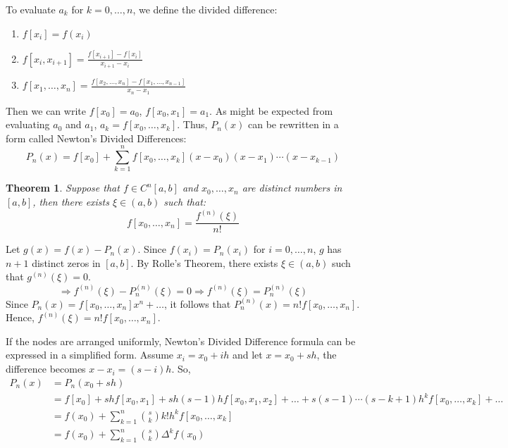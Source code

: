 \documentclass[12pt, a4paper]{article}
\makeatletter
\theoremstyle{break}
\newtheorem{theorem}{Theorem}[section]
\renewenvironment{proof}[1][\proofname]{\par
  \pushQED{\qed}%
  \normalfont \topsep6\p@\@plus6\p@\relax
  \trivlist
  \item[\hskip\labelsep\bfseries #1\@addpunct{.}]\mbox{}\newline\ignorespaces
}{%
  \popQED\endtrivlist\@endpefalse
}
\makeatother
\begin{document}
To evaluate $a_k$ for $k = 0, \dots, n$, we define the divided difference:
\begin{enumerate}
    \item $f[x_i] = f(x_i)$
    \item $f[x_i, x_{i+1}] = \frac{f[x_{i+1}] - f[x_i]}{x_{i+1} - x_i}$
    \item $f[x_1, \dots, x_n] = \frac{f[x_2, \dots, x_n] - f[x_1, \dots, x_{n-1}]}{x_n - x_1}$
\end{enumerate}
Then we can write $f[x_0] = a_0$, $f[x_0, x_1] = a_1$. As might be expected from evaluating $a_0$ and $a_1$, $a_k = f[x_0, \dots, x_k]$. Thus, $P_n(x)$ can be rewritten in a form called Newton's Divided Differences:
\[ P_n(x) = f[x_0] + \sum_{k=1}^{n} f[x_0, \dots, x_k] (x-x_0)(x-x_1)\cdots(x-x_{k-1}) \]

\begin{theorem}
Suppose that $f \in C^n[a,b]$ and $x_0, \dots, x_n$ are distinct numbers in $[a,b]$, then there exists $\xi \in (a,b)$ such that:
\[ f[x_0, \dots, x_n] = \frac{f^{(n)}(\xi)}{n!} \]
\end{theorem}
\begin{proof}
Let $g(x) = f(x) - P_n(x)$. Since $f(x_i) = P_n(x_i)$ for $i = 0, \dots, n$, $g$ has $n+1$ distinct zeros in $[a,b]$. 
By Rolle's Theorem, there exists $\xi \in (a,b)$ such that $g^{(n)}(\xi) = 0$.
\[ \Rightarrow f^{(n)}(\xi) - P_n^{(n)}(\xi) = 0 \Rightarrow f^{(n)}(\xi) = P_n^{(n)}(\xi) \]
Since $P_n(x) = f[x_0, \dots, x_n]x^n + \dots$, it follows that $P_n^{(n)}(x) = n! f[x_0, \dots, x_n]$.
Hence, $f^{(n)}(\xi) = n! f[x_0, \dots, x_n]$.
\end{proof}

If the nodes are arranged uniformly, Newton's Divided Difference formula can be expressed in a simplified form. Assume $x_i = x_0 + ih$ and let $x = x_0 + sh$, the difference becomes $x - x_i = (s-i)h$. So,
\begin{align*}
P_n(x) &= P_n(x_0 + sh) \\
&= f[x_0] + sh f[x_0, x_1] + sh(s-1)h f[x_0, x_1, x_2] + \dots + s(s-1)\cdots(s-k+1)h^k f[x_0, \dots, x_k] + \dots \\
&= f(x_0) + \sum_{k=1}^{n} \binom{s}{k} k! h^k f[x_0, \dots, x_k] \\
&= f(x_0) + \sum_{k=1}^{n} \binom{s}{k} \Delta^k f(x_0)
\end{align*}
\end{document}
